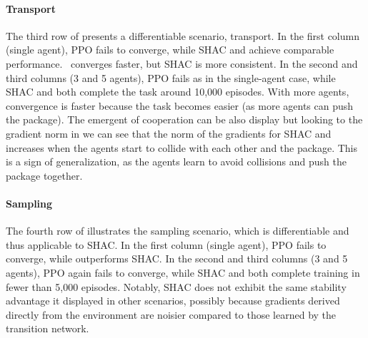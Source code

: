 \paragraph{Transport}
The third row of  presents a differentiable scenario, transport. In the first column (single agent), PPO fails to converge, while SHAC and \fname{} achieve comparable performance.\ \fname{} converges faster, but SHAC is more consistent. In the second and third columns (3 and 5 agents), PPO fails as in the single-agent case, while SHAC and \fname{} both complete the task around 10,000 episodes. With more agents, convergence is faster because the task becomes easier (as more agents can push the package). The emergent of cooperation can be also display but looking to the gradient norm in  we can see that the norm of the gradients for SHAC and \fname{} increases when the agents start to collide with each other and the package. This is a sign of generalization, as the agents learn to avoid collisions and push the package together.

\paragraph{Sampling}
The fourth row of  illustrates the sampling scenario, which is differentiable and thus applicable to SHAC\@. In the first column (single agent), PPO fails to converge, while \fname{} outperforms SHAC\@. In the second and third columns (3 and 5 agents), PPO again fails to converge, while SHAC and \fname{} both complete training in fewer than 5,000 episodes. Notably, SHAC does not exhibit the same stability advantage it displayed in other scenarios, possibly because gradients derived directly from the environment are noisier compared to those learned by the transition network.
